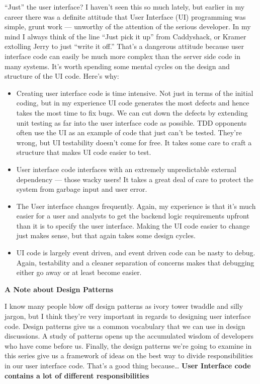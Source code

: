\documentclass{article}
\begin{document}
{“Just” the user interface?  I haven't seen this so much lately, but earlier in my career there was a definite attitude that User Interface (UI) programming was simple, grunt work — unworthy of the attention of the serious developer.  In my mind I always think of the line “Just pick it up” from Caddyshack, or Kramer extolling Jerry to just “write it off.”  That's a dangerous attitude because user interface code can easily be much more complex than the server side code in many systems.  It's worth spending some mental cycles on the design and structure of the UI code.  Here's why:

 \begin{itemize}
 \item  Creating user interface code is time intensive.  Not just in terms of the initial coding, but in my experience UI code generates the most defects and hence takes the most time to fix bugs.  We can cut down the defects by extending unit testing as far into the user interface code as possible.  TDD opponents often use the UI as an example of code that just can't be tested.  They're wrong, but UI testability doesn't come for free.  It takes some care to craft a structure that makes UI code easier to test.  \vspace{5pt}
 \item  User interface code interfaces with an extremely unpredictable external dependency — those wacky users!  It takes a great deal of care to protect the system from garbage input and user error.  \vspace{5pt}
 \item  The User interface changes frequently.  Again, my experience is that it's much easier for a user and analysts to get the backend logic requirements upfront than it is to specify the user interface.  Making the UI code easier to change just makes sense, but that again takes some design cycles.  \vspace{5pt}
 \item  UI code is largely event driven, and event driven code can be nasty to debug.  Again, testability and a cleaner separation of concerns makes that debugging either go away or at least become easier.  \vspace{5pt}
   \end{itemize}

\Large {\textbf{A Note about Design Patterns}}

I know many people blow off design patterns as ivory tower twaddle and silly jargon, but I think they're very important in regards to designing user interface code.  Design patterns give us a common vocabulary that we can use in design discussions.  A study of patterns opens up the accumulated wisdom of developers who have come before us.  Finally, the design patterns we're going to examine in this series give us a framework of ideas on the best way to divide responsibilities in our user interface code.  That's a good thing because…
\Large {\textbf{User Interface code contains a lot of different responsibilities}}

}
\end{document}
